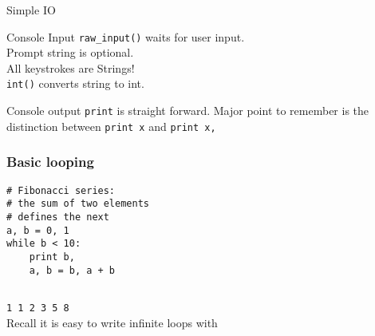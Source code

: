 \documentclass[14pt,compress]{beamer}
\newcounter{time}
\newcommand{\inctime}[1]{\addtocounter{time}{#1}{\tiny \thetime\ m}}
\newcommand{\typ}[1]{\texttt{#1}}
\newcommand{\kwrd}[1]{ \texttt{\textbf{\color{blue}{#1}}}  }
\begin{document}
\begin{frame}{Simple IO}
  \begin{block}
    {Console Input}
    \texttt{raw\_input()} waits for user input.\\Prompt string is optional.\\
    All keystrokes are Strings!\\\texttt{int()} converts string to int.
  \end{block}
  \begin{block}
    {Console output}
    \texttt{print} is straight forward. Major point to remember is the distinction between \texttt{print x} and \texttt{print x,}
  \end{block}
\end{frame}

\begin{frame}[fragile]
  \frametitle{Basic looping}
  \begin{lstlisting}
# Fibonacci series:
# the sum of two elements
# defines the next
a, b = 0, 1
while b < 10:
    print b,
    a, b = b, a + b
 
\end{lstlisting}
\typ{1 1 2 3 5 8}\\  
\alert{Recall it is easy to write infinite loops with \kwrd{while}}
  \inctime{20}
\end{frame}

\end{document}
